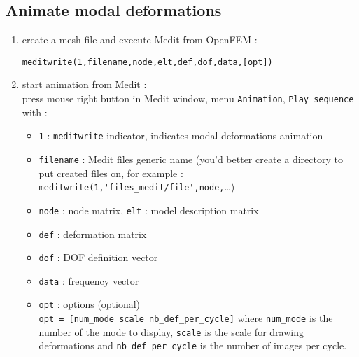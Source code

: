 \documentclass[a4paper]{article}
\begin{document}
\subsection{Animate modal deformations}
\begin{enumerate}
\item create a mesh file and execute Medit from OpenFEM :
\begin{center} \verb+meditwrite(1,filename,node,elt,def,dof,data,[opt])+ \end{center}
\item start animation from Medit :\\
press mouse right button in Medit window, menu \verb+Animation+, \verb+Play sequence+\\
$ $\\
with : 
\begin{itemize}
\item \verb+1+ : \verb+meditwrite+ indicator, indicates modal deformations animation
\item \verb+filename+ : Medit files generic name (you'd better create a directory to put created files on, for example : \\ \verb+meditwrite(1,'files_medit/file',node,+\ldots)
\item \verb+node+ : node matrix, \verb+elt+ : model description matrix
\item \verb+def+ : deformation matrix
\item \verb+dof+ : DOF definition vector
\item \verb+data+ : frequency vector
\item \verb+opt+ : options (optional)\\\verb+opt = [num_mode scale nb_def_per_cycle]+ where \verb+num_mode+ is the number of the mode to display, \verb+scale+ is the scale for drawing deformations and \verb+nb_def_per_cycle+ is the number of images per cycle.
\end{itemize}
\end{enumerate}
\end{document}
